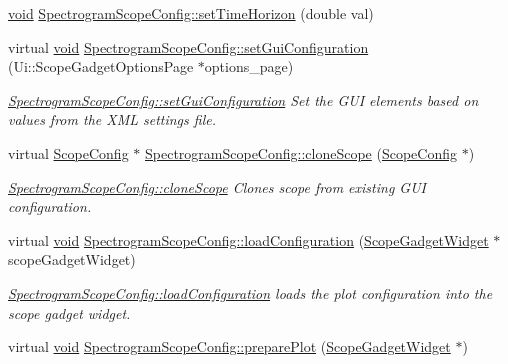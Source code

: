 \begin{DoxyCompactItemize}
\item 
\hyperlink{group___u_a_v_objects_plugin_ga444cf2ff3f0ecbe028adce838d373f5c}{void} \hyperlink{group___scope_plugin_ga511f9914f1f524bd49a6edfa18760501}{\-Spectrogram\-Scope\-Config\-::set\-Time\-Horizon} (double val)
\item 
virtual \hyperlink{group___u_a_v_objects_plugin_ga444cf2ff3f0ecbe028adce838d373f5c}{void} \hyperlink{group___scope_plugin_gaf4d1958704699a8b7bb596fef64c6bd5}{\-Spectrogram\-Scope\-Config\-::set\-Gui\-Configuration} (\-Ui\-::\-Scope\-Gadget\-Options\-Page $\ast$options\-\_\-page)
\begin{DoxyCompactList}\small\item\em \hyperlink{group___scope_plugin_gaf4d1958704699a8b7bb596fef64c6bd5}{\-Spectrogram\-Scope\-Config\-::set\-Gui\-Configuration} \-Set the \-G\-U\-I elements based on values from the \-X\-M\-L settings file. \end{DoxyCompactList}\item 
virtual \hyperlink{class_scope_config}{\-Scope\-Config} $\ast$ \hyperlink{group___scope_plugin_ga7d2fafe0c5f703d03825ad42689a9d73}{\-Spectrogram\-Scope\-Config\-::clone\-Scope} (\hyperlink{class_scope_config}{\-Scope\-Config} $\ast$)
\begin{DoxyCompactList}\small\item\em \hyperlink{group___scope_plugin_ga7d2fafe0c5f703d03825ad42689a9d73}{\-Spectrogram\-Scope\-Config\-::clone\-Scope} \-Clones scope from existing \-G\-U\-I configuration. \end{DoxyCompactList}\item 
virtual \hyperlink{group___u_a_v_objects_plugin_ga444cf2ff3f0ecbe028adce838d373f5c}{void} \hyperlink{group___scope_plugin_gaa4de5cf86195631ccdce65d67b22f31a}{\-Spectrogram\-Scope\-Config\-::load\-Configuration} (\hyperlink{class_scope_gadget_widget}{\-Scope\-Gadget\-Widget} $\ast$scope\-Gadget\-Widget)
\begin{DoxyCompactList}\small\item\em \hyperlink{group___scope_plugin_gaa4de5cf86195631ccdce65d67b22f31a}{\-Spectrogram\-Scope\-Config\-::load\-Configuration} loads the plot configuration into the scope gadget widget. \end{DoxyCompactList}\item 
virtual \hyperlink{group___u_a_v_objects_plugin_ga444cf2ff3f0ecbe028adce838d373f5c}{void} \hyperlink{group___scope_plugin_ga56b200887661925df25743af2f62375b}{\-Spectrogram\-Scope\-Config\-::prepare\-Plot} (\hyperlink{class_scope_gadget_widget}{\-Scope\-Gadget\-Widget} $\ast$)

\end{DoxyCompactItemize}
